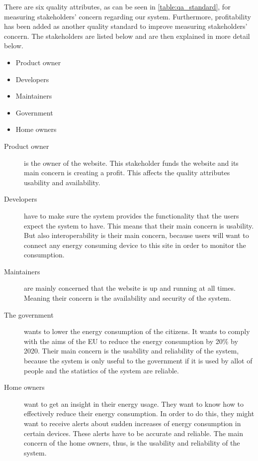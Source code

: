 There are six quality attributes, as can be seen in \autoref{table:qa_standard}, for measuring stakeholders' concern regarding our system. Furthermore, profitability has been added as another quality standard to improve measuring stakeholders' concern. The stakeholders are listed below and are then explained in more detail below.

\begin{itemize}
\item Product owner
\item Developers
\item Maintainers
\item Government
\item Home owners
\end{itemize}

\begin{description}

\item [Product owner] is the owner of the website. This stakeholder funds the website and its main concern is creating a profit. This affects the quality attributes usability and availability.

\item [Developers] have to make sure the system provides the functionality that the users expect the system to have. This means that their main concern is usability. But also interoperability is their main concern, because users will want to connect any energy consuming device to this site in order to monitor the consumption.

\item [Maintainers] are mainly concerned that the website is up and running at all times. Meaning their concern is the availability and security of the system.

\item [The government] wants to lower the energy consumption of the citizens. It wants to comply with the aims of the EU to reduce the energy consumption by 20\% by 2020. Their main concern is the usability and reliability of the system, because the system is only useful to the government if it is used by allot of people and the statistics of the system are reliable.

\item [Home owners] want to get an insight in their energy usage. They want to know how to effectively reduce their energy consumption. In order to do this, they might want to receive alerts about sudden increases of energy consumption in certain devices. These alerts have to be accurate and reliable. The main concern of the home owners, thus, is the usability and reliability of the system.

\end{description}


